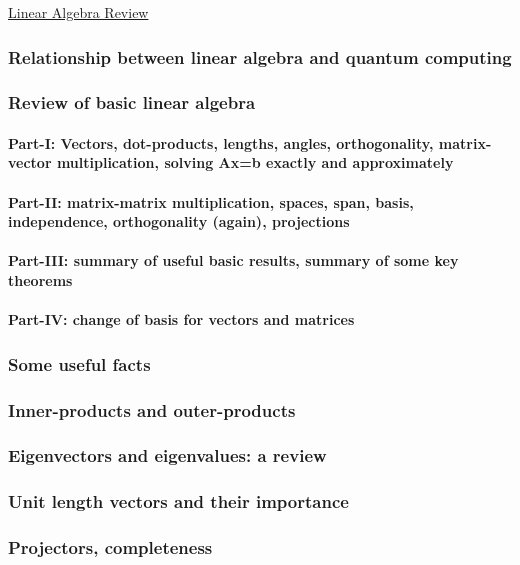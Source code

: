 \documentclass[main.tex]{subfiles}
\begin{document}
\href{https://www2.seas.gwu.edu/~simhaweb/quantum/modules/review/lin-review/lin-review.html}{Linear Algebra Review}

\subsubsection{Relationship between linear algebra and quantum computing}

\subsubsection{Review of basic linear algebra}

\paragraph{Part-I: Vectors, dot-products, lengths, angles, orthogonality, matrix-vector multiplication, solving \textbf{Ax=b} exactly and approximately}

\paragraph{Part-II: matrix-matrix multiplication, spaces, span, basis, independence, orthogonality (again), projections}

\paragraph{Part-III: summary of useful basic results, summary of some key theorems}

\paragraph{Part-IV: change of basis for vectors and matrices}

\subsubsection{Some useful facts}

\subsubsection{Inner-products and outer-products}

\subsubsection{Eigenvectors and eigenvalues: a review}

\subsubsection{Unit length vectors and their importance}

\subsubsection{Projectors, completeness}
\end{document}
